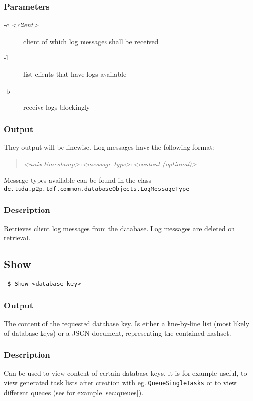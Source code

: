\documentclass[a4paper,11pt]{article}
\begin{document}
\subsubsection{Parameters}
\begin{description}
\item[-c \textit{<client>}] client of which log messages shall be received
\item[-l] list clients that have logs available
\item[-b] receive logs blockingly
\end{description}

\subsubsection{Output}
They output will be linewise. Log messages have the following format:
\begin{quote}
\textit{<unix timestamp>}:\textit{<message type>}:\textit{<content (optional)>}
\end{quote}

Message types available can be found in the class \texttt{de.tuda.p2p.tdf.common.databaseObjects.LogMessageType}

\subsubsection{Description}
Retrieves client log messages from the database. Log messages are deleted on retrieval.

\newpage


\subsection{Show\label{cmd:Show}}
\begin{verbatim}
 $ Show <database key>
\end{verbatim}

\subsubsection{Output}
The content of the requested database key. Is either a line-by-line list (most likely of database keys) or a JSON document, representing the contained hashset.

\subsubsection{Description}
Can be used to view content of certain database keys. It is for example useful, to view generated task lists after creation with eg. \texttt{QueueSingleTasks} or to view different queues (see for example \ref{sec:queues}).
\end{document}
